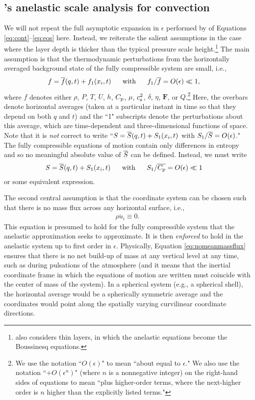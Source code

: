 \documentclass[12pt]{article}
\newcommand{\vecf}{\bm{F}}
\begin{document}
	\subsection{\citet{Gough1969}'s anelastic scale analysis for convection}
	We will not repeat the full asymptotic expansion in $\epsilon$ performed by \citet{Gough1969} of Equations \eqref{eq:cont}--\eqref{eq:eos} here. Instead, we reiterate the salient assumptions in the case where the layer depth is thicker than the typical pressure scale height.\footnote{\citet{Gough1969} also considers thin layers, in which the anelastic equations become the Boussinesq equations.} The main assumption is that the thermodynamic perturbations from the horizontally averaged background state of the fully compressible system are small, i.e.,
	\begin{align}\label{eq:smallthermalpert}
		f = \overline{f}(q,t) + f_1(x_i,t)\ \ \ \ \  &\text{with}\ \ \ \ \  f_1/\overline{f}=O(\epsilon)\ll 1,
	\end{align} 
	where $f$ denotes either $\rho$, $P$, $T$, $U$, $h$, $C_{\rm{p}}$, $\mu$, $c_{\rm s}^2$, $\delta$, $\eta$, $\vecf$, or $Q$.\footnote{We use the notation ``$O(\epsilon)$" to mean ``about equal to $\epsilon$." We also use the notation ``$+O(\epsilon^n)$" (where $n$ is a nonnegative integer) on the right-hand sides of equations to mean ``plus higher-order terms, where the next-higher order is $n$ higher than the explicitly listed terms."} Here, the overbars denote horizontal averages (taken at a particular instant in time so that they depend on both $q$ and $t$) and the ``1" subscripts denote the perturbations about this average, which are time-dependent and three-dimensional functions of space. Note that it is \textit{not} correct to write ``$S=\overline{S}(q,t)+S_1(x_i,t)$ with $S_1/\overline{S}=O(\epsilon)$." The fully compressible equations of motion contain only differences in entropy and so no meaningful absolute value of $\overline{S}$ can be defined. Instead, we must write
	\begin{align}\label{eq:linearent}
	S = \overline{S}(q,t) + S_1(x_i,t) \ \ \ \ \  &\text{with}\ \ \ \ \  S_1/\overline{C_{\rm{p}}}=O(\epsilon)\ll 1
	\end{align}
	or some equivalent expression.
	
	The second central assumption is that the coordinate system can be chosen such that there is no mass flux across any horizontal surface, i.e.,
	\begin{align}\label{eq:nomeanmassflux}
		\overline{\rho u_i}\equiv0.
	\end{align}
	This equation is presumed to hold for the fully compressible system that the anelastic approximation seeks to approximate. It is then \textit{enforced} to hold in the anelastic system up to first order in $\epsilon$. Physically, Equation \eqref{eq:nomeanmassflux} ensures that there is no net build-up of mass at any vertical level at any time, such as during pulsations of the atmosphere (and it means that the inertial coordinate frame in which the equations of motion are written must coincide with the center of mass of the system). In a spherical system (e.g., a spherical shell), the horizontal average would be a spherically symmetric average and the coordinates would point along the spatially varying curvilinear coordinate directions.
	
\end{document}
